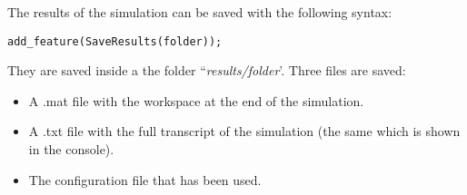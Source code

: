 The results of the simulation can be saved with the following syntax:

\begin{lstlisting}
add_feature(SaveResults(folder));
\end{lstlisting}

\noindent They are saved inside a the folder ``\textit{results/folder}'. Three files are saved:

\begin{itemize}
\item A .mat file with the workspace at the end of the simulation.
\item A .txt file with the full transcript of the simulation (the same which is shown in the console).
\item The configuration file that has been used.
\end{itemize}